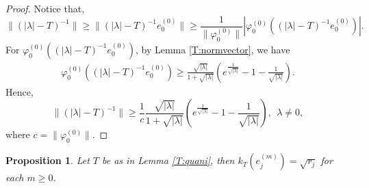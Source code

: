 \documentclass[12pt]{amsart}
\numberwithin{equation}{section}
\theoremstyle{plain}
\newtheorem{prop}[thm]{Proposition}
\theoremstyle{definition}
\begin{document}
\begin{proof}
Notice that,
$$\|(|\lambda|-T)^{-1}\|\geq\|(|\lambda|-T)^{-1}e_0^{(0)}\|
\geq
\frac{1}{\|\varphi_0^{(0)}\|}\left|\varphi_0^{(0)}\left((|\lambda|-T)^{-1}e_0^{(0)}\right)\right|.$$
For
$\varphi_0^{(0)}\left((|\lambda|-T)^{-1}e_0^{(0)}\right)$,
by Lemma \ref{T:normvector},
we have
\begin{align*}
\varphi_0^{(0)}\left((|\lambda|-T)^{-1}e_0^{(0)}\right)
\geq
\frac{\sqrt {|\lambda|}}{1+\sqrt {|\lambda|}}\left(e^{\frac{1}{\sqrt{|\lambda|}}}-1-\frac{1}{\sqrt{|\lambda|}}\right).
\end{align*}
Hence,
\begin{equation*}
\|(|\lambda|-T)^{-1}\|\geq
\frac{1}{c}\frac{\sqrt{|\lambda|}}{1+\sqrt{|\lambda|}}\left(e^{\frac{1}{\sqrt{|\lambda|}}}-1-\frac{1}{\sqrt{|\lambda|}}\right),\ \ \lambda \neq 0,
\end{equation*}
where $c=\|\varphi_0^{(0)}\|$.
\end{proof}

\begin{prop}\label{Kej}
Let $T$ be as in Lemma \ref{T:quani},
then $k_{T}(e_j^{(m)})=\sqrt{r_j}$ for each $m\geq 0$.
\end{prop}
\end{document}
